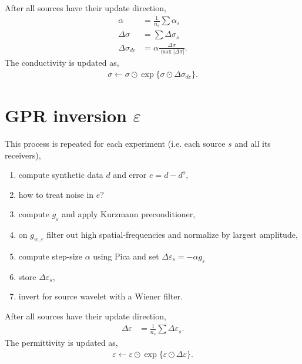 \documentclass[a4paper,12pt]{article}
\begin{document}
After all sources have their update direction,
\begin{align*}
\alpha &= \frac{1}{n_s} \sum\alpha_s \\
\Delta\sigma &= \sum\Delta\sigma_s \\
\Delta\sigma_{dc} &= \alpha\frac{\Delta\sigma}{\max | \Delta\sigma |}.
\end{align*}
The conductivity is updated as,
\begin{align*}
\sigma\gets\sigma\odot\exp\{\sigma\odot\Delta\sigma_{dc}\}.
\end{align*}
% 
\section*{GPR inversion $\varepsilon$}
This process is repeated for each experiment (i.e. each source $s$ and all its receivers),
\begin{enumerate}
\item compute synthetic data $d$ and error $e=d-d^o$,
\item \color{red} how to treat noise in $e$?\color{black}
\item compute $g_{\varepsilon}$ and apply Kurzmann preconditioner,
\item on $g_{w,\varepsilon}$ filter out high spatial-frequencies and normalize by largest amplitude,
\item compute step-size $\alpha$ using Pica and set $\Delta\varepsilon_s=-\alpha g_\varepsilon$
\item store $\Delta\varepsilon_s$,
\item invert for source wavelet with a \color{red} Wiener filter\color{black}.
\end{enumerate}
After all sources have their update direction, 
\begin{align*}
\Delta\varepsilon &= \frac{1}{n_s} \sum\Delta\varepsilon_s.
\end{align*}
The permittivity is updated as,
\begin{align*}
\varepsilon\gets\varepsilon\odot\exp\{\varepsilon\odot\Delta\varepsilon\}.
\end{align*}
% 
\end{document}
